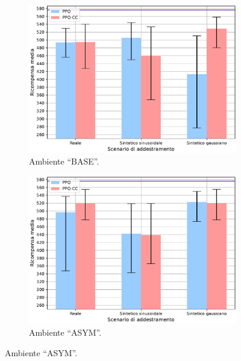 \begin{figure}
    \centering

    \begin{subfigure}{.65\textwidth}
        \centering
        \includegraphics[width=\linewidth]{assets/5/results/eval_BASE_summary_reward.pdf}
        \caption{Ambiente ``BASE''.}
    \end{subfigure}
    
    \begin{subfigure}{.65\textwidth}
        \centering
        \includegraphics[width=\linewidth]{assets/5/results/eval_ASYM_summary_reward.pdf}
        \caption{Ambiente ``ASYM''.}
    \end{subfigure}
    

\end{figure}
